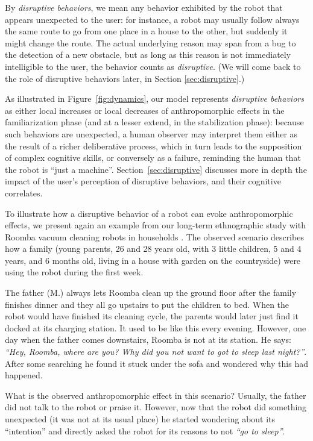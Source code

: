 \documentclass{frontiersSCNS} %
\begin{document}
By \emph{disruptive behaviors}, we mean any behavior exhibited by the robot that
appears unexpected to the user: for instance, a robot may usually follow always
the same route to go from one place in a house to the other, but suddenly it
might change the route. The actual underlying reason may span from a bug to the
detection of a new obstacle, but as long as this reason is not immediately
intelligible to the user, the behavior counts as \emph{disruptive}. (We will
come back to the role of disruptive behaviors later, in Section
\ref{sec:disruptive}.)

As illustrated in Figure~\ref{fig:dynamics}, our model represents
\emph{disruptive behaviors} as either local increases or local decreases of
anthropomorphic effects in the familiarization phase (and at a lesser extend, in
the stabilization phase): because such behaviors are unexpected, a human
observer may interpret them either as the result of a richer deliberative
process, which in turn leads to the supposition of complex cognitive skills, or
conversely as a failure, reminding the human that the robot is ``just a
machine''. Section~\ref{sec:disruptive} discusses more in depth the impact of
the user's perception of disruptive behaviors, and their cognitive correlates.

To illustrate how a disruptive behavior of a robot can evoke anthropomorphic
effects, we present again an example from our long-term ethnographic study with
Roomba vacuum cleaning robots in households \citep{fink_living_2013}. The
observed scenario describes how a family (young parents, 26 and 28 years old,
with 3 little children, 5 and 4 years, and 6 months old, living in a house with
garden on the countryside) were using the robot during the first week.

The father (M.) always lets Roomba clean up the ground floor after the family
finishes dinner and they all go upstairs to put the children to bed. When the
robot would have finished its cleaning cycle, the parents would later just find
it docked at its charging station. It used to be like this every evening.
However, one day when the father comes downstairs, Roomba is not at its station.
He says: \emph{``Hey, Roomba, where are you? Why did you not want to got to
sleep last night?''}. After some searching he found it stuck under the sofa and
wondered why this had happened. 

What is the observed anthropomorphic effect in this scenario? Usually, the
father did not talk to the robot or praise it. However, now that the robot did
something unexpected (it was not at its usual place) he started wondering about
its ``intention'' and directly asked the robot for its reasons to not
\textit{``go to sleep''}. 
\end{document}
